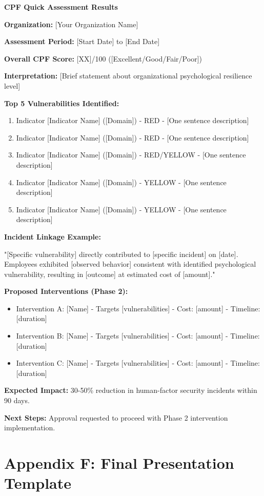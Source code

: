 \documentclass[11pt,a4paper]{article}
\begin{document}
\textbf{CPF Quick Assessment Results}

\textbf{Organization:} [Your Organization Name]

\textbf{Assessment Period:} [Start Date] to [End Date]

\textbf{Overall CPF Score:} [XX]/100 ([Excellent/Good/Fair/Poor])

\textbf{Interpretation:} [Brief statement about organizational psychological resilience level]

\textbf{Top 5 Vulnerabilities Identified:}
\begin{enumerate}
\item Indicator [Indicator Name] ([Domain]) - RED - [One sentence description]
\item Indicator [Indicator Name] ([Domain]) - RED - [One sentence description]
\item Indicator [Indicator Name] ([Domain]) - RED/YELLOW - [One sentence description]
\item Indicator [Indicator Name] ([Domain]) - YELLOW - [One sentence description]
\item Indicator [Indicator Name] ([Domain]) - YELLOW - [One sentence description]
\end{enumerate}

\textbf{Incident Linkage Example:}

"[Specific vulnerability] directly contributed to [specific incident] on [date]. Employees exhibited [observed behavior] consistent with identified psychological vulnerability, resulting in [outcome] at estimated cost of [amount]."

\textbf{Proposed Interventions (Phase 2):}
\begin{itemize}
\item Intervention A: [Name] - Targets [vulnerabilities] - Cost: [amount] - Timeline: [duration]
\item Intervention B: [Name] - Targets [vulnerabilities] - Cost: [amount] - Timeline: [duration]
\item Intervention C: [Name] - Targets [vulnerabilities] - Cost: [amount] - Timeline: [duration]
\end{itemize}

\textbf{Expected Impact:} 30-50\% reduction in human-factor security incidents within 90 days.

\textbf{Next Steps:} Approval requested to proceed with Phase 2 intervention implementation.

\section{Appendix F: Final Presentation Template}
\end{document}
